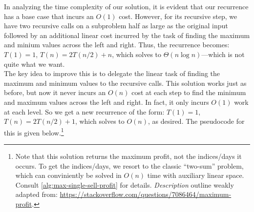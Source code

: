 \documentclass[10pt, letterpaper]{article}
\begin{document}
\begin{enumerate}[label={\bfseries Q\arabic*.}]
\begin{enumerate}
        In analyzing the time complexity of our solution, it is evident that our recurrence has a base case that
        incurs an $O(1)$ cost. However, for its recursive step, we have two recursive calls on a subproblem half
        as large as the original input followed by an additional linear cost incurred by the task of finding the
        maximum and minium values across the left and right. Thus, the recurrence becomes: $T(1) = 1$, $T(n) =
        2T(n/2) + n$, which solves to $\Theta(n \log n)$---which is not quite what we want. \\

        The key idea to improve this is to delegate the linear task of finding the maximum and minimum values to
        the recursive calls. This solution works just as before, but now it never incurs an $O(n)$ cost at each
        step to find the minimum and maximum values across the left and right. In fact, it only incurs $O(1)$ work
        at each level. So we get a new recurrence of the form: $T(1) = 1$, $T(n) = 2T(n/2) + 1$, which solves
        to $O(n)$, as desired. The pseudocode for this is given below.\footnote{
          Note that this solution returns the maximum profit, not the indices/days it occurs. To get the indices/days,
          we resort to the classic ``two-sum'' problem, which can conviniently be solved in $O(n)$ time with auxiliary
          linear space. Consult \autoref{alg:max-single-sell-profit} for details.
          {\itshape Description} outline weakly adapted from: \href{https://stackoverflow.com/questions/7086464/maximum-single-sell-profit}{\url{https://stackoverflow.com/questions/7086464/maximum-profit}}.
        }


\end{enumerate}
\end{enumerate}
\end{document}
